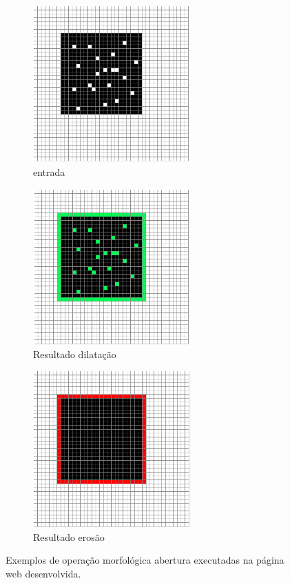 \documentclass[conference,harvard,brazil,english]{sbatex}
\begin{document}
\begin{figure}[htp]
\centering
	\begin{subfigure}{0.5\textwidth}
	    \centering
		\includegraphics[width=6cm]{Fechamento_original.PNG}
    	\caption{entrada}
  	\end{subfigure}
	\begin{subfigure}{0.5\textwidth}
	    \centering
      	\includegraphics[width=6cm]{Fechamento_dilate.PNG}
      	\caption{Resultado dilatação}
    \end{subfigure}
	\begin{subfigure}{0.5\textwidth}
	    \centering
      	\includegraphics[width=6cm]{Fechamento_erode.PNG}
      	\caption{Resultado erosão}
    \end{subfigure}
\caption{Exemplos de operação morfológica abertura executadas na página web desenvolvida.}
\label{operacao_fechamento}
\end{figure}
\end{document}
